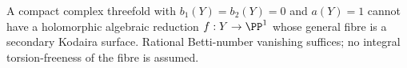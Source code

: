 \begin{proposition}\hypertarget{tag-01FF}{}\label{cdp:st:C.3.9}


A compact complex threefold with $b_1(Y)=b_2(Y)=0$ and
$a(Y)=1$ cannot have a holomorphic algebraic reduction
$f:Y\to\PP^1$ whose general fibre is a secondary Kodaira
surface. Rational Betti-number vanishing suffices; no integral
torsion-freeness of the fibre is assumed.
\end{proposition}


